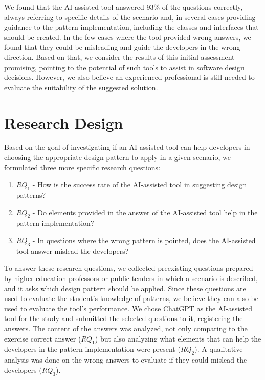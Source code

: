 \documentclass[runningheads]{llncs}
\begin{document}
We found that the AI-assisted tool answered 93\% of the questions correctly, always referring to specific details of the scenario and, in several cases providing guidance to the pattern implementation, including the classes and interfaces that should be created. In the few cases where the tool provided wrong answers, we found that they could be misleading and guide the developers in the wrong direction. Based on that, we consider the results of this initial assessment promising, pointing to the potential of such tools to assist in software design decisions. However, we also believe an experienced professional is still needed to evaluate the suitability of the suggested solution.


\section{Research Design}\label{sec2}

Based on the goal of investigating if an AI-assisted tool can help developers in choosing the appropriate design pattern to apply in a given scenario, we formulated three more specific research questions:

\begin{enumerate}
    \item $RQ_1$ - How is the success rate of the AI-assisted tool in suggesting design patterns?
    \item $RQ_2$ - Do elements provided in the answer of the AI-assisted tool help in the pattern implementation?
    \item $RQ_3$ - In questions where the wrong pattern is pointed, does the AI-assisted tool answer mislead the developers?
\end{enumerate}

To answer these research questions, we collected preexisting questions prepared by higher education professors or public tenders in which a scenario is described, and it asks which design pattern should be applied. Since these questions are used to evaluate the student's knowledge of patterns, we believe they can also be used to evaluate the tool's performance. We chose ChatGPT as the AI-assisted tool for the study and submitted the selected questions to it, registering the answers. The content of the answers was analyzed, not only comparing to the exercise correct answer ($RQ_1$) but also analyzing what elements that can help the developers in the pattern implementation were present ($RQ_2$). A qualitative analysis was done on the wrong answers to evaluate if they could mislead the developers ($RQ_3$).
\end{document}

